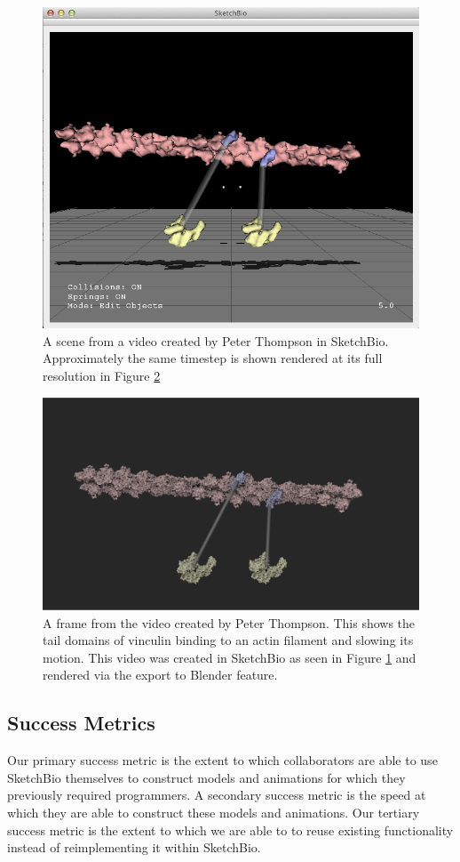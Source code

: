 \documentclass[twocolumn]{bmcart}%
\begin{document}
\begin{figure}[h]
\centering
\includegraphics[width=0.9\columnwidth]{peter_model.png}
\caption{A scene from a video created by Peter Thompson in SketchBio.  Approximately the same timestep is shown rendered at its full resolution in Figure \ref{fig:peter_video}}
\label{fig:peter_model}
\end{figure}

\begin{figure}[h!]
\centering
\includegraphics[width=0.9\columnwidth]{peter_video.png}
\caption{A frame from the video created by Peter Thompson.  This shows the tail domains of vinculin binding to an actin filament and slowing its motion.  This video was created in SketchBio as seen in Figure \ref{fig:peter_model} and rendered via the export to Blender feature.}
\label{fig:peter_video}
\end{figure}

\subsection*{Success Metrics}
Our primary success metric is the extent to which collaborators are able to use SketchBio themselves to construct models and animations for which they previously required programmers.  A secondary success metric is the speed at which they are able to construct these models and animations.  Our tertiary success metric is the extent to which we are able to to reuse existing functionality instead of reimplementing it within SketchBio.
\end{document}
